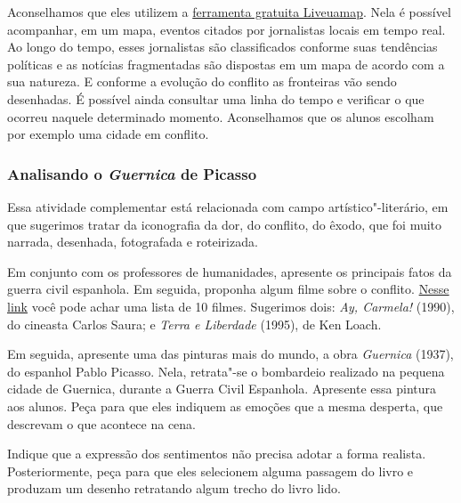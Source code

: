 \documentclass[12pt]{extarticle}
\begin{document}

Aconselhamos que eles utilizem a \href{https://liveuamap.com/}{ferramenta gratuita Liveuamap}. 
Nela é possível acompanhar, em um mapa, eventos citados por jornalistas locais 
em tempo real. Ao longo do tempo, esses jornalistas são classificados conforme
suas tendências políticas e as notícias fragmentadas são dispostas em 
um mapa de acordo com a sua natureza. E conforme a evolução do conflito as fronteiras
vão sendo desenhadas. É possível ainda consultar uma linha do tempo e 
verificar o que ocorreu naquele determinado momento. Aconselhamos que 
os alunos escolham por exemplo uma cidade em conflito.  

\subsubsection{Analisando o \emph{Guernica} de Picasso}

Essa atividade complementar está relacionada com campo artístico"-literário,
em que sugerimos tratar da
iconografia da dor, do conflito, do êxodo, que foi muito narrada,
desenhada, fotografada e roteirizada. 


Em conjunto com os professores de
humanidades, apresente os principais fatos da guerra civil espanhola. 
Em seguida, proponha algum filme sobre o conflito. 
\href{https://www.brasildefato.com.br/2020/07/18/no-pasaran-10-filmes-sobre-a-guerra-civil-espanhola}{Nesse link} 
você pode achar uma lista de 10 filmes. Sugerimos dois: \emph{Ay, Carmela!} (1990), 
do cineasta Carlos Saura; e  \textit{Terra e Liberdade} (1995), de Ken Loach.

Em seguida, apresente uma das pinturas mais
do mundo, a obra \emph{Guernica} (1937), do espanhol Pablo Picasso. Nela,
retrata"-se o bombardeio realizado na pequena cidade de Guernica,
durante a Guerra Civil Espanhola. Apresente essa pintura aos alunos.
Peça para que eles indiquem as emoções que a mesma desperta, que
descrevam o que acontece na cena. 

Indique que a expressão dos
sentimentos não precisa adotar a forma realista. Posteriormente, peça
para que eles selecionem alguma passagem do livro e produzam um
desenho retratando algum trecho do livro lido. 

\end{document}
